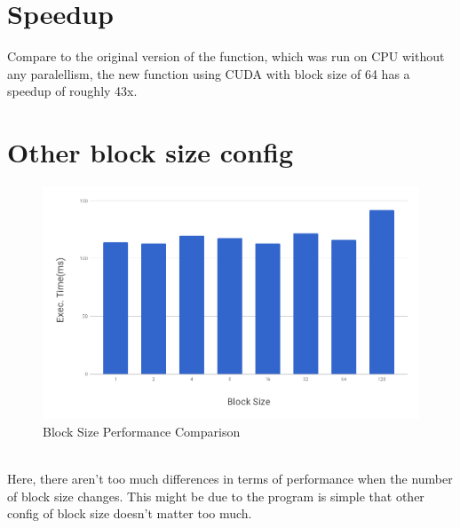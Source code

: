 \documentclass[a4paper,11pt, notitlepage]{article}
\begin{document}
\section{Speedup}
Compare to the original version of the function, which was run on CPU without any paralellism, the new function using CUDA with block size of 64 has a speedup of roughly 43x. \\

\section{Other block size config}
\begin{figure}[H]
\includegraphics[width=15cm]{chart-cuda-block-size.png}
\centering
\caption{Block Size Performance Comparison}
\end{figure}
~\\
Here, there aren't too much differences in terms of performance when the number of block size changes. This might be due to the program is simple that other config of block size doesn't matter too much. \\
\end{document}
